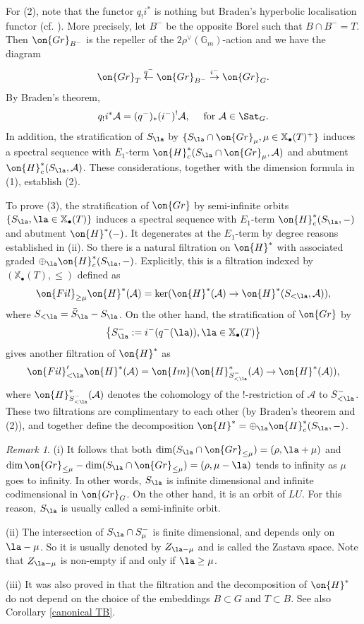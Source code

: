 \documentclass[]{pcmi}
\theoremstyle{plain}
\theoremstyle{remark}
\newtheorem{rmk}[equation]{Remark}
\theoremstyle{definition}
\newcommand{\bG}{{\mathbb G}}
\newcommand{\mA}{{\mathcal A}}
\newcommand{\Gr}{{\on{Gr}}}
\def\xcoch{\mathbb{X}_\bullet}
\begin{document}
For (2), note that
the functor $q_!i^*$ is nothing but
Braden's hyperbolic localisation functor (cf. \cite{Br}). More precisely, let $B^-$ be the opposite Borel such that $B\cap B^-=T$. Then $\Gr_{B^-}$ is the repeller of the $2\rho^\vee(\bG_m)$-action and we have the diagram 
$$\Gr_T\stackrel{q^-}{\leftarrow}\Gr_{B^-}\stackrel{i^-}{\to}\Gr_G.$$ By Braden's theorem, 
$$q_!i^*\mA=(q^-)_*(i^-)^!\mA, \quad \mbox{ for } \mA\in\Sat_G.$$ In addition, the stratification of $S_\la$ by $\{S_\la\cap\Gr_\mu, \mu\in\xcoch(T)^+\}$ induces a spectral sequence with $E_1$-term $\on{H}_c^*(S_\la\cap\Gr_\mu,\mA)$ and abutment $\on{H}_c^*(S_\la,\mA)$. 
These considerations, together with the dimension formula in (1), establish (2). 


To prove (3), the stratification of $\Gr$ by semi-infinite orbits $\{S_\la, \la\in\xcoch(T)\}$ induces a spectral sequence with $E_1$-term $\on{H}_c^*(S_\la,-)$ and abutment $\on{H}^*(-)$. It degenerates at the $E_1$-term by degree reasons established in (ii). So there is a natural filtration on $\on{H}^*$ with associated graded $\oplus_\la \on{H}_c^*(S_\la,-)$. Explicitly, this is a filtration indexed by $(\xcoch(T),\leq)$ defined as
\[\on{Fil}_{\geq \mu}\on{H}^*(\mA)=\ker(\on{H}^*(\mA)\to \on{H}^*(S_{<\la},\mA)),\] 
where $S_{<\la}=\bar{S}_\la-S_\la$. On the other hand, the stratification of $\Gr$ by $$\left\{S^-_\la:=i^-(q^-(\la)), \la\in\xcoch(T)\right\}$$ gives another filtration of $\on{H}^*$ as
\[\on{Fil}'_{<\la}\on{H}^*(\mA)=\on{Im}(\on{H}^*_{S^-_{<\la}}(\mA)\to \on{H}^*(\mA)),\]
where $\on{H}^*_{S^-_{<\la}}(\mA)$ denotes the cohomology of the $!$-restriction of $\mA$ to $S^-_{<\la}$.
These two filtrations are complimentary to each other (by Braden's theorem and (2)), and together define the decomposition $\on{H}^*=\oplus_\la \on{H}_c^*(S_\la,-)$.

\begin{rmk}
(i) It follows that both $\dim (S_\la\cap \Gr_{\leq \mu})=(\rho,\la+\mu)$ and $\dim \Gr_{\leq \mu}-\dim (S_\la\cap \Gr_{\leq \mu})=(\rho,\mu-\la)$ tends to infinity as $\mu$ goes to infinity. In other words, $S_\la$ is infinite dimensional and infinite codimensional in $\Gr_G$. On the other hand, it is an orbit of $LU$. For this reason, $S_\la$ is usually called a semi-infinite orbit. 

(ii) The intersection of $S_\la\cap S^-_\mu$ is finite dimensional, and depends only on $\la-\mu$. So it is usually denoted by $Z_{\la-\mu}$ and is called the Zastava space. Note that $Z_{\la-\mu}$ is non-empty if and only if $\la\geq \mu$.

(iii) It was also proved in \cite[Theorem 3.6]{MV} that the filtration and the decomposition of $\on{H}^*$ do not depend on the choice of the embeddings $B\subset G$ and $T\subset B$. See also Corollary \ref{canonical TB}.
\end{rmk}
\end{document}
